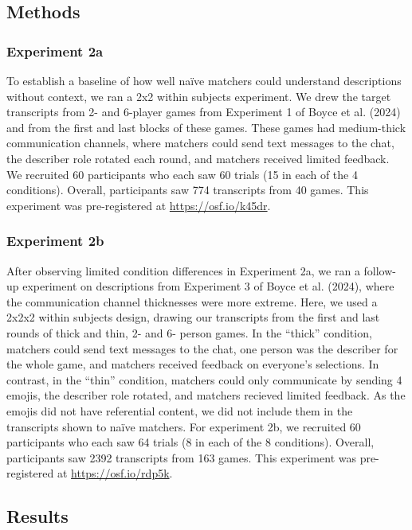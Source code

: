 \documentclass[10pt, letterpaper]{article}
\begin{document}
\subsection{Methods}\label{methods-1}

\subsubsection{Experiment 2a}\label{experiment-2a}

To establish a baseline of how well naïve matchers could understand
descriptions without context, we ran a 2x2 within subjects experiment.
We drew the target transcripts from 2- and 6-player games from
Experiment 1 of Boyce et al. (2024) and from the first and last blocks
of these games. These games had medium-thick communication channels,
where matchers could send text messages to the chat, the describer role
rotated each round, and matchers received limited feedback. We recruited
60 participants who each saw 60 trials (15 in each of the 4 conditions).
Overall, participants saw 774 transcripts from 40 games. This experiment
was pre-registered at \url{https://osf.io/k45dr}.

\subsubsection{Experiment 2b}\label{experiment-2b}

After observing limited condition differences in Experiment 2a, we ran a
follow-up experiment on descriptions from Experiment 3 of Boyce et al.
(2024), where the communication channel thicknesses were more extreme.
Here, we used a 2x2x2 within subjects design, drawing our transcripts
from the first and last rounds of thick and thin, 2- and 6- person
games. In the ``thick'' condition, matchers could send text messages to
the chat, one person was the describer for the whole game, and matchers
received feedback on everyone's selections. In contrast, in the ``thin''
condition, matchers could only communicate by sending 4 emojis, the
describer role rotated, and matchers recieved limited feedback. As the
emojis did not have referential content, we did not include them in the
transcripts shown to naïve matchers. For experiment 2b, we recruited 60
participants who each saw 64 trials (8 in each of the 8 conditions).
Overall, participants saw 2392 transcripts from 163 games. This
experiment was pre-registered at \url{https://osf.io/rdp5k}.

\subsection{Results}\label{results}
\end{document}
